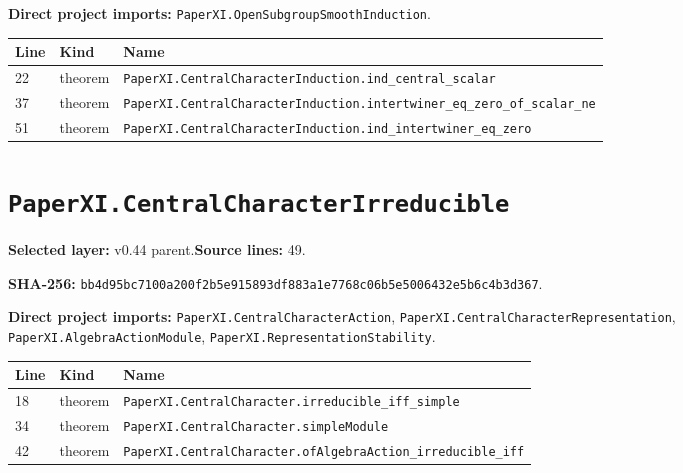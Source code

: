 \documentclass[10pt,oneside]{book}
\begin{document}

\textbf{Direct project imports:} \nolinkurl{PaperXI.OpenSubgroupSmoothInduction}.

\begin{longtable}{@{}p{}p{}p{}@{}}\toprule Line&Kind&Name\\\midrule\endhead

22&theorem&\nolinkurl{PaperXI.CentralCharacterInduction.ind_central_scalar}\\

37&theorem&\nolinkurl{PaperXI.CentralCharacterInduction.intertwiner_eq_zero_of_scalar_ne}\\

51&theorem&\nolinkurl{PaperXI.CentralCharacterInduction.ind_intertwiner_eq_zero}\\

\bottomrule\end{longtable}

\section{\texorpdfstring{\nolinkurl{PaperXI.CentralCharacterIrreducible}}{PaperXI.CentralCharacterIrreducible}}\label{module:PaperXI.CentralCharacterIrreducible}

\textbf{Selected layer:} v0.44 parent.\quad\textbf{Source lines:} 49.\par\textbf{SHA-256:} {\scriptsize\nolinkurl{bb4d95bc7100a200f2b5e915893df883a1e7768c06b5e5006432e5b6c4b3d367}}.


\textbf{Direct project imports:} \nolinkurl{PaperXI.CentralCharacterAction}, \nolinkurl{PaperXI.CentralCharacterRepresentation}, \nolinkurl{PaperXI.AlgebraActionModule}, \nolinkurl{PaperXI.RepresentationStability}.

\begin{longtable}{@{}p{}p{}p{}@{}}\toprule Line&Kind&Name\\\midrule\endhead

18&theorem&\nolinkurl{PaperXI.CentralCharacter.irreducible_iff_simple}\\

34&theorem&\nolinkurl{PaperXI.CentralCharacter.simpleModule}\\

42&theorem&\nolinkurl{PaperXI.CentralCharacter.ofAlgebraAction_irreducible_iff}\\

\bottomrule\end{longtable}
\end{document}

